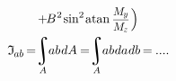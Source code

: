 \documentclass[14pt]{extarticle}
\DeclareMathOperator*{\integral}{\scalerel*{\rotatebox{12}{$\!\textstyle\int\!$}}{\int}} %
\newcommand\sine{\operatorname{sin}}
\newcommand\atan{\operatorname{atan}}
\begin{document}
\[\begin{gathered}
\hspace{-0.1ex}+\hspace{-0.25ex}
B^{\hspace{.1ex}2} \hspace{-.2ex} \sine^{2} \hspace{-0.22ex} \atan \scalebox{.88}{$ \displaystyle\frac{\raisebox{-0.12em}{$M_{\hspace{-0.1ex}\scalebox{.8}{$y$}}$}}{M_{\hspace{-0.1ex}\scalebox{.8}{$z$}}} $} \hspace{.2ex}
\Bigr)
\\
\mathfrak{I}_{\hspace{-0.1ex}\scalebox{.8}{$ab$}} \hspace{-0.25ex}
=\hspace{-0.6ex}
\integral_{A} \hspace{-0.6ex} ab \hspace{.15ex} dA \hspace{-0.1ex}
=\hspace{-0.6ex}
\integral_{A} \hspace{-0.6ex} ab \hspace{.1ex} da \hspace{.1ex} db \hspace{-0.2ex}
=\hspace{-0.1ex}
....
\end{gathered}\]
\end{document}
